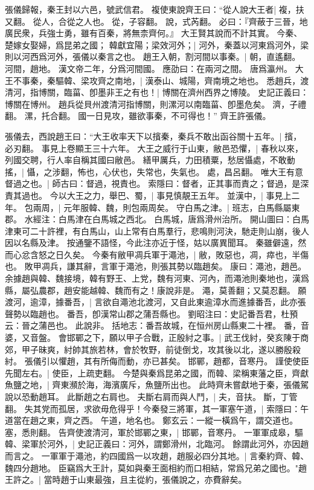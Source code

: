 張儀歸報，秦王封以六邑，號武信君。
複使東說齊王曰：“從人說大王者|{
	複，扶又翻。
	從人，合從之人也。
	從，子容翻。
	說，式芮翻。
}
必曰：『齊蔽于三晉，地廣民衆，兵強士勇，雖有百秦，將無柰齊何。』
大王賢其說而不計其實。
今秦、楚嫁女娶婦，爲昆弟之國；
韓獻宜陽；梁效河外；|{
	河外，秦蓋以河東爲河外，梁則以河西爲河外，張儀以秦言之也。
}
趙王入朝，割河間以事秦。|{
	朝，直遙翻。
	河間，趙地。
	漢文帝二年，分爲河間國。
	應劭曰：在兩河之間。
	唐爲瀛州。
}
大王不事秦，秦驅韓、梁攻齊之南地，|{
	漢泰山、城陽，齊南境之地也。
}
悉趙兵，渡清河，指博關，臨菑、卽墨非王之有也！|{
	博關在濟州西界之博陵。
	史記正義曰：博關在博州。
	趙兵從貝州渡清河指博關，則漯河以南臨菑、卽墨危矣。
	濟，子禮翻。
	漯，托合翻。
}
國一日見攻，雖欲事秦，不可得也！”
齊王許張儀。

張儀去，西說趙王曰：“大王收率天下以擯秦，秦兵不敢出函谷關十五年。|{
	擯，必刃翻。
	事見上卷顯王三十六年。
}
大王之威行于山東，敝邑恐懼，|{
	春秋以來，列國交聘，行人率自稱其國曰敝邑。
}
繕甲厲兵，力田積粟，愁居懾處，不敢動搖，|{
	懾，之涉翻，怖也，心伏也，失常也，失氣也。
	處，昌呂翻。
}
唯大王有意督過之也。|{
	師古曰：督過，視責也。
	索隱曰：督者，正其事而責之；督過，是深責其過也。
}
今以大王之力，舉巴、蜀，|{
	事見慎靚王五年。
}
並漢中，|{
	事見上二年。
}
包兩周，|{
	元年服韓、魏，則包兩周矣。
}
守白馬之津。|{
	班志，白馬縣屬東郡。
	水經注：白馬津在白馬城之西北。
	白馬城，唐爲滑州治所。
	開山圖曰：白馬津東可二十許裡，有白馬山，山上常有白馬羣行，悲鳴則河決，馳走則山崩，後人因以名縣及津。
	按通鑒不語怪，今此注亦近于怪，姑以廣異聞耳。
}
秦雖僻遠，然而心忿含怒之日久矣。
	今秦有敝甲凋兵軍于澠池，|{
	敝，敗惡也，凋，瘁也，半傷也。
	敗甲凋兵，謙其辭，言軍于澠池，則張其勢以臨趙矣。
	康曰：澠池，趙邑。
	余據趙與韓、魏接境，韓有野王、上党，魏有河東、河內，而澠池則秦地也，漢爲縣，屬弘農郡，趙安能越韓、魏而有之！康說非是。
	澠，莫善翻；又莫忍翻。
}
願渡河，逾漳，據番吾，|{
	言欲自澠池北渡河，又自此東逾漳水而進據番吾，此亦張聲勢以臨趙也。
	番吾，卽漢常山郡之蒲吾縣也。
	劉昭注曰：史記番吾君，杜預云：晉之蒲邑也。
	此說非。
	括地志：番吾故城，在恒州房山縣東二十裡。
	番，音婆，又音盤。
}
會邯鄲之下，願以甲子合戰，正殷紂之事。|{
	武王伐紂，癸亥陳于商郊，甲子昧爽，紂帥其旅若林，會於牧野，前徒倒戈，攻其後以北，遂以勝殷殺紂。
	張儀引以懼趙，其有所侮而動，亦已甚矣。
	邯鄲，趙都，音寒丹。
}
謹使使臣先聞左右。|{
	使臣，上疏吏翻。
}
今楚與秦爲昆弟之國，而韓、梁稱東藩之臣，齊獻魚鹽之地，|{
	齊東瀕於海，海濱廣斥，魚鹽所出也。
	此時齊未嘗獻地于秦，張儀駕說以恐動趙耳。
}
此斷趙之右肩也。
	夫斷右肩而與人鬥，|{
	夫，音扶。
	斷，丁管翻。
}
失其党而孤居，求欲毋危得乎！今秦發三將軍，其一軍塞午道，|{
	索隱曰：午道當在趙之東，齊之西。
	午道，地名也。
	鄭玄云：一縱一橫爲午，謂交道也。
	塞，悉則翻。
}
告齊使渡清河，軍於邯鄲之東，|{
	邯鄲，音寒丹。
}
一軍軍成皋，驅韓、梁軍於河外，|{
	史記正義曰：河外，謂鄭滑州，北臨河。
	餘謂此河外，亦因趙而言之。
}
一軍軍于澠池，約四國爲一以攻趙，趙服必四分其地。|{
	言秦約齊、韓、魏四分趙地。
}
臣竊爲大王計，莫如與秦王面相約而口相結，常爲兄弟之國也。"趙王許之。|{
	當時趙于山東最強，且主從約，張儀說之，亦費辭矣。
}

